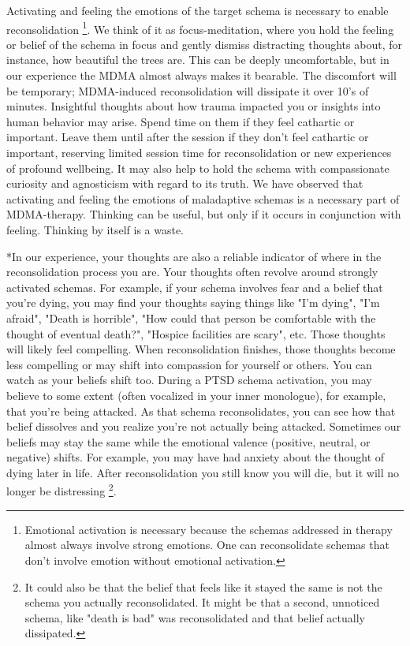 \documentclass[12pt,letterpaper]{book}
\begin{document}

Activating and feeling the emotions of the target schema is necessary to enable reconsolidation \cite{ecker2015misunderstood} \footnote{Emotional activation is necessary because the schemas addressed in therapy almost always involve strong emotions. One can reconsolidate schemas that don't involve emotion without emotional activation.}. We think of it as focus-meditation, where you hold the feeling or belief of the schema in focus and gently dismiss distracting thoughts about, for instance, how beautiful the trees are. This can be deeply uncomfortable, but in our experience the MDMA almost always makes it bearable. The discomfort will be temporary; MDMA-induced reconsolidation will dissipate it over 10's of minutes. Insightful thoughts about how trauma impacted you or insights into human behavior may arise. Spend time on them if they feel cathartic or important. Leave them until after the session if they don't feel cathartic or important, reserving limited session time for reconsolidation or new experiences of profound wellbeing. It may also help to hold the schema with compassionate curiosity and agnosticism with regard to its truth. We have observed that activating and feeling the emotions of maladaptive schemas is a necessary part of MDMA-therapy. Thinking can be useful, but only if it occurs in conjunction with feeling. Thinking by itself is a waste.

*In our experience, your thoughts are also a reliable indicator of where in the reconsolidation process you are. Your thoughts often revolve around strongly activated schemas. For example, if your schema involves fear and a belief that you're dying, you may find your thoughts saying things like "I'm dying", "I'm afraid", "Death is horrible", "How could that person be comfortable with the thought of eventual death?", "Hospice facilities are scary", etc. Those thoughts will likely feel compelling. When reconsolidation finishes, those thoughts become less compelling or may shift into compassion for yourself or others. You can watch as your beliefs shift too. During a PTSD schema activation, you may believe to some extent (often vocalized in your inner monologue), for example, that you're being attacked. As that schema reconsolidates, you can see how that belief dissolves and you realize you're not actually being attacked. Sometimes our beliefs may stay the same while the emotional valence (positive, neutral, or negative) shifts. For example, you may have had anxiety about the thought of dying later in life. After reconsolidation you still know you will die, but it will no longer be distressing \footnote{It could also be that the belief that feels like it stayed the same is not the schema you actually reconsolidated. It might be that a second, unnoticed schema, like "death is bad" was reconsolidated and that belief actually dissipated.}.
\end{document}

